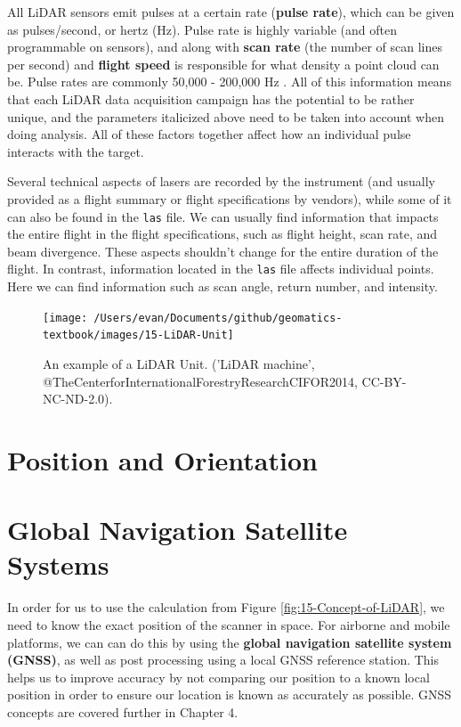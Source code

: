 \documentclass[
]{book}
\begin{document}
All LiDAR sensors emit pulses at a certain rate (\textbf{pulse rate}), which can be given as pulses/second, or hertz (Hz). Pulse rate is highly variable (and often programmable on sensors), and along with \textbf{scan rate} (the number of scan lines per second) and \textbf{flight speed} is responsible for what density a point cloud can be. Pulse rates are commonly 50,000 - 200,000 Hz \citep{White2013}. All of this information means that each LiDAR data acquisition campaign has the potential to be rather unique, and the parameters italicized above need to be taken into account when doing analysis. All of these factors together affect how an individual pulse interacts with the target.

Several technical aspects of lasers are recorded by the instrument (and usually provided as a flight summary or flight specifications by vendors), while some of it can also be found in the \texttt{las} file. We can usually find information that impacts the entire flight in the flight specifications, such as flight height, scan rate, and beam divergence. These aspects shouldn't change for the entire duration of the flight. In contrast, information located in the \texttt{las} file affects individual points. Here we can find information such as scan angle, return number, and intensity.

\begin{figure}
\texttt{[image: /Users/evan/Documents/github/geomatics-textbook/images/15-LiDAR-Unit]} \caption{An example of a LiDAR Unit. ('LiDAR machine', @TheCenterforInternationalForestryResearchCIFOR2014, CC-BY-NC-ND-2.0).}\label{fig:15-LiDAR-Unit}
\end{figure}

\hypertarget{position-and-orientation}{%
\section{Position and Orientation}\label{position-and-orientation}}

\hypertarget{global-navigation-satellite-systems}{%
\section{Global Navigation Satellite Systems}\label{global-navigation-satellite-systems}}

In order for us to use the calculation from Figure \ref{fig:15-Concept-of-LiDAR}, we need to know the exact position of the scanner in space. For airborne and mobile platforms, we can can do this by using the \textbf{global navigation satellite system (GNSS)}, as well as post processing using a local GNSS reference station. This helps us to improve accuracy by not comparing our position to a known local position in order to ensure our location is known as accurately as possible. GNSS concepts are covered further in Chapter 4.
\end{document}
